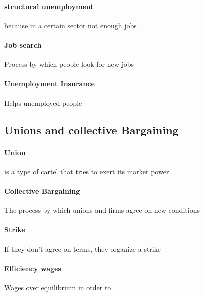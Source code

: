 \documentclass[a4paper,titlepage] {scrartcl}
\begin{document}
\paragraph{structural unemployment} because in a certain sector not enough jobs %
\label{par:structural_unemployment}


\paragraph{Job search} %
\label{par:job_search}
Process by which people look for new jobs

\paragraph{Unemployment Insurance} %
\label{par:unemployment_insurance}
Helps unemployed people

\subsection{Unions and collective Bargaining} %
\label{sub:unions_and_collective_bargaining}
\paragraph{Union} %
\label{par:union}
is a type of cartel that tries to exert its market power	
\paragraph{Collective Bargaining} %
\label{par:collective_bargaining}
The process by which unions and firms agree on new conditions
\paragraph{Strike} %
\label{par:strike}
If they don't agree on terms, they organize a strike
\paragraph{Efficiency wages} %
\label{par:efficiency_wages}
Wages over equilibrium in order to 
\end{document}
